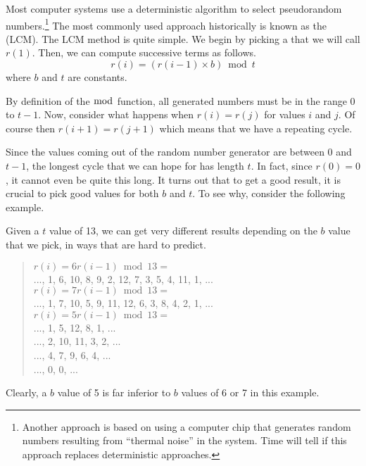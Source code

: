 Most computer systems use a deterministic algorithm to select
pseudorandom numbers.\footnote{Another approach is based on
using a computer chip that generates random numbers resulting
from ``thermal noise'' in the system.
Time will tell if this approach replaces deterministic approaches.}
The most commonly used approach historically is known as the 
 (LCM).
The LCM method is quite simple.
We begin by picking a  that we will call $r(1)$.
Then, we can compute successive terms as follows.
\[r(i) = (r(i-1)\times b) \bmod t\]
where $b$ and $t$ are constants.

By definition of the $\bmod$ function, all generated numbers must be
in the range 0 to $t-1$.
Now, consider what happens when $r(i) = r(j)$ for values $i$ and $j$.
Of course then $r(i+1) = r(j+1)$ which means that we have a repeating
cycle.

Since the values coming out of the random number generator are between
0 and $t-1$, the longest cycle that we can hope for has length $t$.
In fact, since $r(0) = 0$, it cannot even be quite this long.
It turns out that to get a good result, it is crucial to pick good
values for both $b$ and $t$. 
To see why, consider the following example.

\begin{example}
Given a $t$ value of 13, we can get very different results depending
on the $b$ value that we pick, in ways that are hard to predict.

\begin{verse}
$r(i) = 6r(i-1) \bmod 13 =$\\
\quad ..., 1, 6, 10, 8, 9, 2, 12, 7, 3, 5, 4, 11, 1, ...\\

$r(i) = 7r(i-1) \bmod 13 =$\\
\quad ..., 1, 7, 10, 5, 9, 11, 12, 6, 3, 8, 4, 2, 1, ...\\

$r(i) = 5r(i-1) \bmod 13 =$\\
\quad ..., 1, 5, 12, 8, 1, ...\\
\quad ..., 2, 10, 11, 3, 2, ...\\
\quad ..., 4, 7, 9, 6, 4, ...\\
\quad ..., 0, 0, ...\\
\end{verse}

Clearly, a $b$ value of 5 is far inferior to $b$ values of 6 or 7 in
this example.
\end{example}

